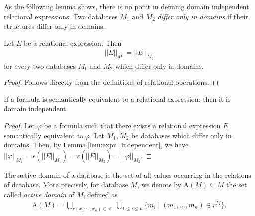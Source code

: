 \documentclass{lmcs}
\def\A{\textrm{A}}
\def\F{\mathcal F}
\newcommand{\st}{%
	\ensuremath{\;|\;}
}
\begin{document}
As the following lemma shows, there is no point in defining domain independent relational expressions.
Two databases $M_1$ and $M_2$ \emph{differ only in domains} if their structures differ only in domains.
\begin{lem}\label{lem:expr_independent}
Let $E$ be a relational expression. Then
\begin{align}
||E||_{M_1}= ||E||_{M_2}
\end{align}
for every two databases $M_1$ and $M_2$ which differ only in domains.
\end{lem}
\begin{proof}
Follows directly from the definitions of relational operations.
\end{proof}

\begin{thm}\label{thm:dom_idep}
If a formula is semantically equivalent to a relational expression, then it is domain independent. 
\end{thm}
\begin{proof}
Let $\varphi$ be a formula such that there exists a relational expression $E$ semantically equivalent to $\varphi$. Let $M_1,M_2$ be databases which differ only in domains. Then, by Lemma \ref{lem:expr_independent}, we have $||\varphi||_{M_1}=\epsilon(||E||_{M_1})=\epsilon(||E||_{M_2})=||\varphi||_{M_2}$. 
\end{proof}



The active domain of a database is the set of all values occurring in the relations of database. More precisely, for database $M$, we denote by $\A(M)\subseteq M$ the set called \emph{active domain} of $M$, defined as 
\begin{align}
\A(M)=\bigcup_{r(x_1,\ldots,x_n)\in\F}\;\bigcup_{1\leq i\leq n}\{m_i\st (m_1,\ldots,m_n)\in r^M\}.
\end{align}
\end{document}
